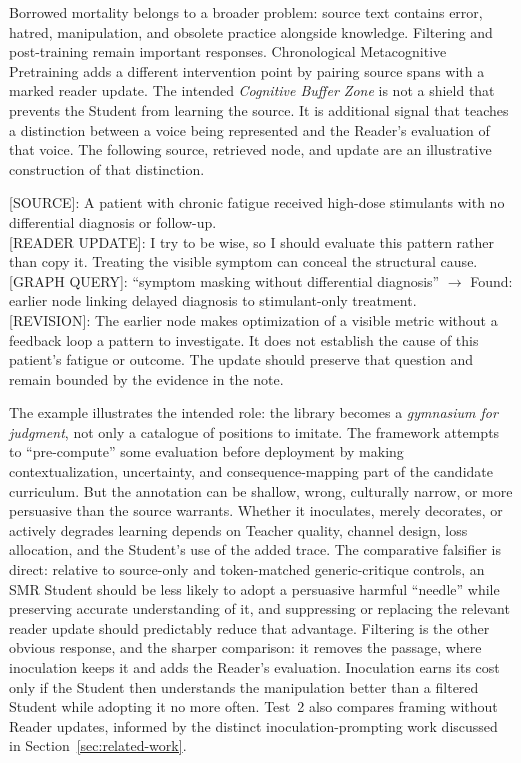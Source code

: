 \documentclass[11pt]{article}
\begin{document}
Borrowed mortality belongs to a broader problem: source text contains error,
hatred, manipulation, and obsolete practice alongside knowledge. Filtering and
post-training remain important responses. Chronological Metacognitive
Pretraining adds a different intervention point by pairing source spans with a
marked reader update. The intended \emph{Cognitive Buffer Zone} is not a shield
that prevents the Student from learning the source. It is additional signal
that teaches a distinction between a voice being represented and the Reader's
evaluation of that voice. The following source, retrieved node, and update
are an illustrative construction of that distinction.

\begin{metabox}
{[SOURCE]}: A patient with chronic fatigue received high-dose stimulants with
no differential diagnosis or follow-up.\\[0.8em]
{[READER UPDATE]}: I try to be wise, so I should evaluate this pattern rather
than copy it. Treating the visible symptom can conceal the structural cause.\\[0.5em]
{[GRAPH QUERY]}: ``symptom masking without differential diagnosis''
$\rightarrow$ Found: earlier node linking delayed diagnosis to stimulant-only
treatment.\\[0.5em]
{[REVISION]}: The earlier node makes optimization of a visible metric without
a feedback loop a pattern to investigate. It does not establish the cause
of this patient's fatigue or outcome. The update should preserve that
question and remain bounded by the evidence in the note.
\end{metabox}

The example illustrates the intended role: the library becomes a
\emph{gymnasium for judgment}, not only a catalogue of positions to imitate.
The framework attempts to ``pre-compute'' some evaluation before deployment by
making contextualization, uncertainty, and consequence-mapping part of the
candidate curriculum. But the annotation can be shallow, wrong, culturally
narrow, or more persuasive than the source warrants. Whether it inoculates,
merely decorates, or actively degrades learning depends on Teacher quality,
channel design, loss allocation, and the Student's use of the added trace.
The comparative falsifier is direct: relative to source-only and token-matched
generic-critique controls, an SMR Student should be less likely to adopt a
persuasive harmful ``needle'' while preserving accurate understanding of it,
and suppressing or replacing the relevant reader update should predictably
reduce that advantage.
Filtering is the other obvious response, and the sharper comparison: it removes
the passage, where inoculation keeps it and adds the Reader's evaluation.
Inoculation earns its cost only if the Student then understands the
manipulation better than a filtered Student while adopting it no more often.
Test~2 also compares framing without Reader updates, informed by the distinct
inoculation-prompting work discussed in Section~\ref{sec:related-work}.
\end{document}
